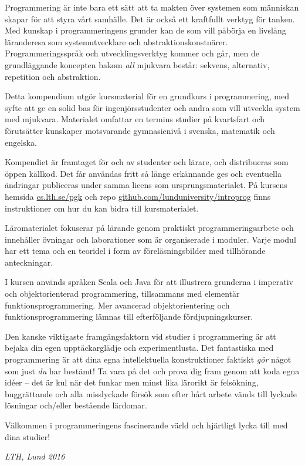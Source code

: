


Programmering är inte bara ett sätt att ta makten över systemen som människan skapar för att styra vårt samhälle. Det är också ett kraftfullt verktyg för tanken. Med kunskap i programmeringens grunder kan de som vill påbörja en livslång läranderesa som systemutvecklare och abstraktionskonstnärer. Programmeringsspråk och utvecklingsverktyg kommer och går, men de grundläggande koncepten bakom \emph{all} mjukvara består: sekvens, alternativ, repetition och abstraktion. 

Detta kompendium utgör kursmaterial för en grundkurs i programmering, med syfte att ge en solid bas för ingenjörsstudenter och andra som vill utveckla system med mjukvara. Materialet omfattar en termins studier på kvartsfart och förutsätter kunskaper motsvarande gymnasienivå i svenska, matematik och engelska. 

Kompendiet är framtaget för och av studenter och lärare, och distribueras som öppen källkod. Det får användas fritt så länge erkännande ges och eventuella ändringar publiceras under samma licens som ursprungsmaterialet. På kursens hemsida \href{http://cs.lth.se/pgk}{cs.lth.se/pgk} och repo \href{http://github.com/lunduniversity/introprog}{github.com/lunduniversity/introprog} finns instruktioner om hur du kan bidra till kursmaterialet.

Läromaterialet fokuserar på lärande genom praktiskt programmeringsarbete och innehåller övningar och laborationer som är organiserade i moduler. Varje modul har ett tema och en teoridel i form av föreläsningsbilder med tillhörande anteckningar. 

I kursen används språken Scala och Java för att illustrera grunderna i imperativ och objektorienterad programmering, tillsammans med elementär funktionsprogrammering. Mer avancerad objektorientering och funktionsprogrammering lämnas till efterföljande fördjupningskurser. 

Den kanske viktigaste framgångsfaktorn vid studier i programmering är att bejaka din egen upptäckarglädje och experimentlusta. Det fantastiska med programmering är att dina egna intellektuella konstruktioner faktiskt \emph{gör} något som just \emph{du} har bestämt! Ta vara på det och prova dig fram genom att koda egna idéer -- det är kul när det funkar men minst lika lärorikt är felsökning, buggrättande och alla misslyckade försök som efter hårt arbete vänds till lyckade lösningar och/eller bestående lärdomar. 

Välkommen i programmeringens fascinerande värld och hjärtligt lycka till med dina studier!

\vspace{2em}\noindent\emph{LTH, Lund 2016}


